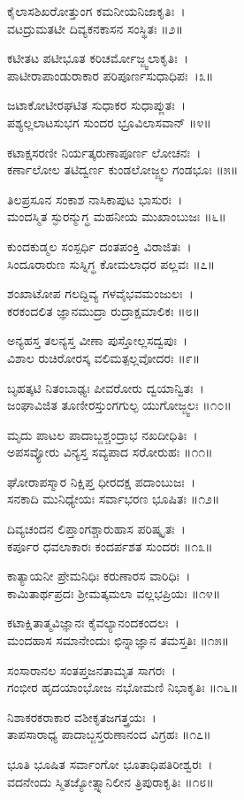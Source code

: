 ಕೈಲಾಸಶಿಖರೋತ್ತುಂಗ ಕಮನೀಯನಿಜಾಕೃತಿಃ~।\\
ವಟದ್ರುಮತಟೀ ದಿವ್ಯಕನಕಾಸನ ಸಂಸ್ಥಿತಃ ॥೨॥

	ಕಟೀತಟ ಪಟೀಭೂತ ಕರಿಚರ್ಮೋಜ್ಜ್ವಲಾಕೃತಿಃ~।\\
	ಪಾಟೀರಾಪಾಂಡುರಾಕಾರ ಪರಿಪೂರ್ಣಸುಧಾಧಿಪಃ~।೩॥

ಜಟಾಕೋಟೀರಘಟಿತ ಸುಧಾಕರ ಸುಧಾಪ್ಲುತಃ~।\\
ಪಶ್ಯಲ್ಲಲಾಟಸುಭಗ ಸುಂದರ ಭ್ರೂವಿಲಾಸವಾನ್ ॥೪॥

	ಕಟಾಕ್ಷಸರಣೀ ನಿರ್ಯತ್ಕರುಣಾಪೂರ್ಣ ಲೋಚನಃ~।\\
	ಕರ್ಣಾಲೋಲ ತಟಿದ್ವರ್ಣ ಕುಂಡಲೋಜ್ಜ್ವಲ ಗಂಡಭೂಃ ॥೫॥

ತಿಲಪ್ರಸೂನ ಸಂಕಾಶ ನಾಸಿಕಾಪುಟ ಭಾಸುರಃ~।\\
ಮಂದಸ್ಮಿತ ಸ್ಫುರನ್ಮುಗ್ಧ ಮಹನೀಯ ಮುಖಾಂಬುಜಃ ॥೬॥

	ಕುಂದಕುಡ್ಮಲ ಸಂಸ್ಪರ್ಧಿ ದಂತಪಂಕ್ತಿ ವಿರಾಜಿತಃ~।\\
	ಸಿಂದೂರಾರುಣ ಸುಸ್ನಿಗ್ಧ ಕೋಮಲಾಧರ ಪಲ್ಲವಃ ॥೭॥

ಶಂಖಾಟೋಪ ಗಲದ್ದಿವ್ಯ ಗಳವೈಭವಮಂಜುಲಃ~।\\
ಕರಕಂದಲಿತ ಜ್ಞಾನಮುದ್ರಾ ರುದ್ರಾಕ್ಷಮಾಲಿಕಃ ॥೮॥

	ಅನ್ಯಹಸ್ತ ತಲನ್ಯಸ್ತ ವೀಣಾ ಪುಸ್ತೋಲ್ಲಸದ್ವಪುಃ~।\\
	ವಿಶಾಲ ರುಚಿರೋರಸ್ಕ ವಲಿಮತ್ಪಲ್ಲವೋದರಃ ॥೯॥

ಬೃಹತ್ಕಟಿ ನಿತಂಬಾಢ್ಯಃ ಪೀವರೋರು ದ್ವಯಾನ್ವಿತಃ~।\\
ಜಂಘಾವಿಜಿತ ತೂಣೀರಸ್ತುಂಗಗುಲ್ಫ ಯುಗೋಜ್ಜ್ವಲಃ ॥೧೦॥

	ಮೃದು ಪಾಟಲ ಪಾದಾಬ್ಜಶ್ಚಂದ್ರಾಭ ನಖದೀಧಿತಿಃ~।\\
	ಅಪಸವ್ಯೋರು ವಿನ್ಯಸ್ತ ಸವ್ಯಪಾದ ಸರೋರುಹಃ ॥೧೧॥

ಘೋರಾಪಸ್ಮಾರ ನಿಕ್ಷಿಪ್ತ ಧೀರದಕ್ಷ ಪದಾಂಬುಜಃ~।\\
ಸನಕಾದಿ ಮುನಿಧ್ಯೇಯಃ ಸರ್ವಾಭರಣ ಭೂಷಿತಃ ॥೧೨॥

	ದಿವ್ಯಚಂದನ ಲಿಪ್ತಾಂಗಶ್ಚಾರುಹಾಸ ಪರಿಷ್ಕೃತಃ~।\\
	ಕರ್ಪೂರ ಧವಲಾಕಾರಃ ಕಂದರ್ಪಶತ ಸುಂದರಃ ॥೧೩॥

ಕಾತ್ಯಾಯನೀ ಪ್ರೇಮನಿಧಿಃ ಕರುಣಾರಸ ವಾರಿಧಿಃ~।\\
ಕಾಮಿತಾರ್ಥಪ್ರದಃ ಶ್ರೀಮತ್ಕಮಲಾ ವಲ್ಲಭಪ್ರಿಯಃ ॥೧೪॥

	ಕಟಾಕ್ಷಿತಾತ್ಮವಿಜ್ಞಾನಃ ಕೈವಲ್ಯಾನಂದಕಂದಲಃ~।\\
	ಮಂದಹಾಸ ಸಮಾನೇಂದುಃ ಛಿನ್ನಾಜ್ಞಾನ ತಮಸ್ತತಿಃ ॥೧೫॥

ಸಂಸಾರಾನಲ ಸಂತಪ್ತಜನತಾಮೃತ ಸಾಗರಃ~।\\
ಗಂಭೀರ ಹೃದಯಾಂಭೋಜ ನಭೋಮಣಿ ನಿಭಾಕೃತಿಃ ॥೧೬॥

	ನಿಶಾಕರಕರಾಕಾರ ವಶೀಕೃತಜಗತ್ತ್ರಯಃ~।\\
	ತಾಪಸಾರಾಧ್ಯ ಪಾದಾಬ್ಜಸ್ತರುಣಾನಂದ ವಿಗ್ರಹಃ ॥೧೭॥

ಭೂತಿ ಭೂಷಿತ ಸರ್ವಾಂಗೋ ಭೂತಾಧಿಪತಿರೀಶ್ವರಃ~।\\
ವದನೇಂದು ಸ್ಮಿತಜ್ಯೋತ್ಸ್ನಾನಿಲೀನ ತ್ರಿಪುರಾಕೃತಿಃ ॥೧೮॥

